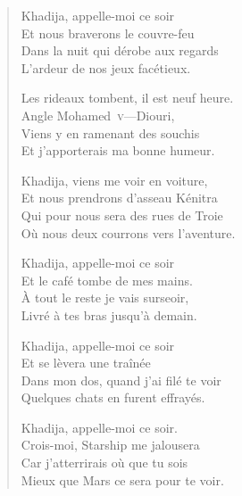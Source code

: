 \begin{verse}%
  \quatrain%
  Khadija, appelle-moi ce soir\\  %
  Et nous braverons le couvre-feu\\  %
  Dans la nuit qui dérobe aux regards\\  %
  L’ardeur de nos jeux facétieux.

  Les rideaux tombent, il est neuf heure.\\  %
  Angle Mohamed~\textsc{v}—Diouri,\\  %
  Viens y en ramenant des souchis\\  %
  Et j’apporterais ma bonne humeur.

  Khadija, viens me voir en voiture,\\  %
  Et nous prendrons d’asseau Kénitra\\  %
  Qui pour nous sera des rues de Troie\\  %
  Où nous deux courrons vers l’aventure.

  Khadija, appelle-moi ce soir\\  %
  Et le  café tombe de mes mains.\\  %
  À tout le reste je vais surseoir,\\  %
  Livré à tes bras jusqu’à demain.

  Khadija, appelle-moi ce soir\\  %
  Et se lèvera une traînée\\  %
  Dans mon dos, quand j’ai filé te voir\\  %
  Quelques chats en furent effrayés.

  Khadija, appelle-moi ce soir.\\  %
  Crois-moi, Starship me jalousera\\  %
  Car j’atterrirais où que tu sois\\  %
  Mieux que Mars ce sera pour te voir.
\end{verse}

